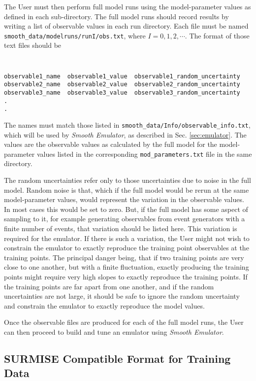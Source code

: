 \documentclass[UserManual.tex]{subfiles}
\begin{document}
The User must then perform full model runs using the model-parameter values as defined in each sub-directory. The full model runs should record results by writing a list of observable values in each run directory. Each file must be named {\tt smooth\_data/modelruns/runI/obs.txt}, where $I=0,1,2,\cdots$. The format of those text files should be
{\tt
\begin{verbatim}
observable1_name  observable1_value  observable1_random_uncertainty
observable2_name  observable2_value  observable2_random_uncertainty
observable3_name  observable3_value  observable3_random_uncertainty
.
.
\end{verbatim}
}
The names must match those listed in {\tt smooth\_data/Info/observable\_info.txt}, which will be used by {\it Smooth Emulator}, as described in Sec. \ref{sec:emulator}. The values are the observable values as calculated by the full model for the model-parameter values listed in the corresponding {\tt mod\_parameters.txt} file in the same directory.

The random uncertainties refer only to those uncertainties due to noise in the full model. Random noise is that, which if the full model would be rerun at the same model-parameter values, would represent the variation in the observable values. In most cases this would be set to zero. But, if the full model has some aspect of sampling to it, for example generating observables from event generators with a finite number of events, that variation should be listed here. This variation is required for the emulator. If there is such a variation, the User might not wish to constrain the emulator to exactly reproduce the training point observables at the training points. The principal danger being, that if two training points are very close to one another, but with a finite fluctuation, exactly producing the training points might require very high slopes to exactly reproduce the training points. If the training points are far apart from one another, and if the random uncertainties are not large, it should be safe to ignore the random uncertainty and constrain the emulator to exactly reproduce the model values. 

Once the observable files are produced for each of the full model runs, the User can then proceed to build and tune an emulator using {\it Smooth Emulator}.

\subsection{SURMISE Compatible Format for Training Data}
\end{document}
